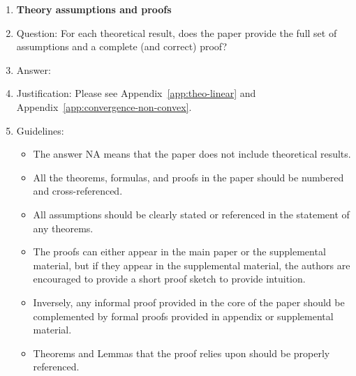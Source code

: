 \documentclass{article}
\theoremstyle{plain}
\theoremstyle{definition}
\theoremstyle{remark}
\begin{document}
\begin{enumerate}
\item {\bf Theory assumptions and proofs}
    \item[] Question: For each theoretical result, does the paper provide the full set of assumptions and a complete (and correct) proof?
    \item[] Answer: \answerYes{} %
    \item[] Justification: Please see Appendix~\ref{app:theo-linear} and Appendix~\ref{app:convergence-non-convex}.
    \item[] Guidelines:
    \begin{itemize}
        \item The answer NA means that the paper does not include theoretical results. 
        \item All the theorems, formulas, and proofs in the paper should be numbered and cross-referenced.
        \item All assumptions should be clearly stated or referenced in the statement of any theorems.
        \item The proofs can either appear in the main paper or the supplemental material, but if they appear in the supplemental material, the authors are encouraged to provide a short proof sketch to provide intuition. 
        \item Inversely, any informal proof provided in the core of the paper should be complemented by formal proofs provided in appendix or supplemental material.
        \item Theorems and Lemmas that the proof relies upon should be properly referenced. 
    \end{itemize}


\end{enumerate}
\end{document}
